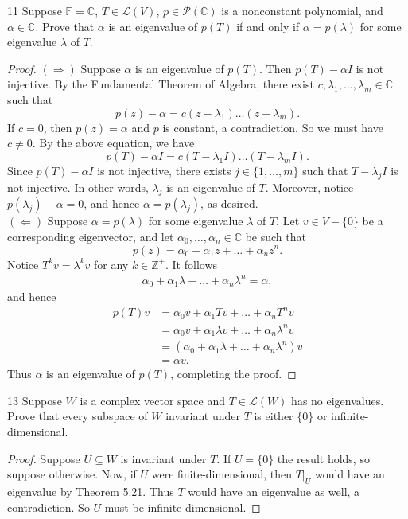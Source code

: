 \documentclass[11pt]{extarticle}
\newenvironment{problem}[1]{\begin{prob*}{#1}{}}{\end{prob*}}
\newcommand{\Z}{\mathbb{Z}}
\newcommand{\C}{\mathbb{C}}
\newcommand{\F}{\mathbb{F}}
\newcommand{\poly}{\mathcal{P}}
\newcommand{\Hom}{\mathcal{L}}
\newcommand{\restr}[1]{|_{#1}}
\begin{document}
\begin{problem}{11}
Suppose $\F=\C$, $T\in\Hom(V)$, $p\in\poly(\C)$ is a nonconstant polynomial, and $\alpha\in\C$.  Prove that $\alpha$ is an eigenvalue of $p(T)$ if and only if $\alpha=p(\lambda)$ for some eigenvalue $\lambda$ of $T$.
\end{problem}
\begin{proof}
$(\Rightarrow)$ Suppose $\alpha$ is an eigenvalue of $p(T)$.  Then $p(T) - \alpha I$ is not injective.  By the Fundamental Theorem of Algebra, there exist $c, \lambda_1,\dots, \lambda_m\in\C$ such that
\begin{equation*}
p(z) - \alpha = c(z - \lambda_1)\dots (z - \lambda_m).  
\end{equation*}
If $c = 0$, then $p(z) = \alpha$ and $p$ is constant, a contradiction.  So we must have $c\neq 0$.  By the above equation, we have
\begin{equation*}
p(T) - \alpha I = c(T - \lambda_1 I)\dots (T - \lambda_m I).
\end{equation*}
Since $p(T) - \alpha I$ is not injective, there exists $j\in\{1,\dots,m\}$ such that $T-\lambda_j I$ is not injective.  In other words, $\lambda_j$ is an eigenvalue of $T$.  Moreover, notice $p(\lambda_j) - \alpha = 0$, and hence $\alpha = p(\lambda_j)$, as desired.\\
\indent $(\Leftarrow)$ Suppose $\alpha = p(\lambda)$ for some eigenvalue $\lambda$ of $T$.  Let $v\in V-\{0\}$ be a corresponding eigenvector, and let $\alpha_0,\dots,\alpha_n\in\C$ be such that
\begin{equation*}
p(z) = \alpha_0 + \alpha_1z + \dots + \alpha_nz^n.
\end{equation*}
Notice $T^kv = \lambda^kv$ for any $k\in\Z^+$.  It follows
\begin{align*}
\alpha_0 + \alpha_1\lambda + \dots + \alpha_n \lambda^n = \alpha,
\end{align*}
and hence
\begin{align*}
p(T)v &= \alpha_0v + \alpha_1 Tv + \dots + \alpha_n T^n v\\
&= \alpha_0v + \alpha_1\lambda v + \dots + \alpha_n \lambda^n v\\
&= \left(\alpha_0 + \alpha_1\lambda + \dots + \alpha_n \lambda^n \right)v\\
&= \alpha v.
\end{align*}
Thus $\alpha$ is an eigenvalue of $p(T)$, completing the proof.
\end{proof}

\begin{problem}{13}
Suppose $W$ is a complex vector space and $T\in\Hom(W)$ has no eigenvalues.  Prove that every subspace of $W$ invariant under $T$ is either $\{0\}$ or infinite-dimensional.
\end{problem}
\begin{proof}
Suppose $U\subseteq W$ is invariant under $T$.  If $U=\{0\}$ the result holds, so suppose otherwise.  Now, if $U$ were finite-dimensional, then $T\restr{U}$ would have an eigenvalue by Theorem 5.21.  Thus $T$ would have an eigenvalue as well, a contradiction.  So $U$ must be infinite-dimensional.
\end{proof}
\end{document}
